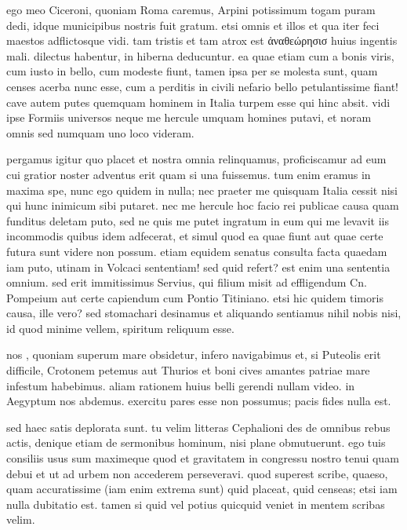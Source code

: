 


 ego meo Ciceroni, quoniam Roma caremus, Arpini potissimum togam puram dedi, idque municipibus nostris fuit gratum. etsi omnis et illos et qua iter feci maestos adflictosque vidi. tam tristis et tam atrox est ἀναθεώρησισ huius ingentis mali. dilectus habentur, in hiberna deducuntur. ea quae etiam cum a bonis viris, cum iusto in bello, cum modeste fiunt, tamen ipsa per se molesta sunt, quam censes acerba nunc esse, cum a perditis in civili nefario bello petulantissime fiant! cave autem putes quemquam hominem in Italia turpem esse qui hinc absit. vidi ipse Formiis universos neque me hercule umquam homines putavi, et noram omnis sed numquam uno loco videram.

 pergamus igitur quo placet et nostra omnia relinquamus, proficiscamur ad eum cui gratior noster adventus erit quam si una fuissemus. tum enim eramus in maxima spe, nunc ego quidem in nulla; nec praeter me quisquam Italia cessit nisi qui hunc inimicum sibi putaret. nec me hercule hoc facio rei publicae causa quam funditus deletam puto, sed ne quis me putet ingratum in eum qui me levavit iis incommodis quibus idem adfecerat, et simul quod ea quae fiunt aut quae certe futura sunt videre non possum. etiam equidem senatus consulta facta quaedam iam puto, utinam in Volcaci sententiam! sed quid refert? est enim una sententia omnium. sed erit immitissimus Servius, qui filium misit ad effligendum Cn. Pompeium aut certe capiendum cum Pontio Titiniano. etsi hic quidem timoris causa, ille vero? sed stomachari desinamus et aliquando sentiamus nihil nobis nisi, id quod minime vellem, spiritum reliquum esse.

 nos , quoniam superum mare obsidetur, infero navigabimus et, si Puteolis erit difficile, Crotonem petemus aut Thurios et boni cives amantes patriae mare infestum habebimus. aliam rationem huius belli gerendi nullam video. in Aegyptum nos abdemus. exercitu pares esse non possumus; pacis fides nulla est.

 sed haec satis deplorata sunt. tu velim litteras Cephalioni des de omnibus rebus actis, denique etiam de sermonibus hominum, nisi plane obmutuerunt. ego tuis consiliis usus sum maximeque quod et gravitatem in congressu nostro tenui quam debui et ut ad urbem non accederem perseveravi. quod superest scribe, quaeso, quam accuratissime (iam enim extrema sunt) quid placeat, quid censeas; etsi iam nulla dubitatio est. tamen si quid vel potius quicquid veniet in mentem scribas velim.

